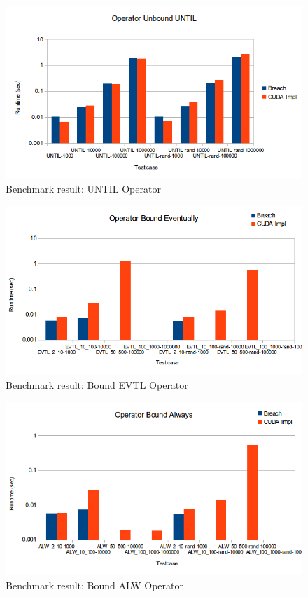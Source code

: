 \documentclass[a4paper,10pt]{article}
\begin{document}
\begin{figure}[H]
    \includegraphics[scale=0.5]{bm_until.png}
    \caption{
        \label{fig:bm_until}
        Benchmark result: UNTIL Operator}
\end{figure}

\begin{figure}[H]
    \includegraphics[scale=0.4]{bm_bevtl.png}
    \caption{
        \label{fig:bm_bevtl}
        Benchmark result: Bound EVTL Operator}
\end{figure}

\begin{figure}[H]
    \includegraphics[scale=0.5]{bm_balw.png}
    \caption{
        \label{fig:bm_balw}
        Benchmark result: Bound ALW Operator}
\end{figure}
\end{document}
